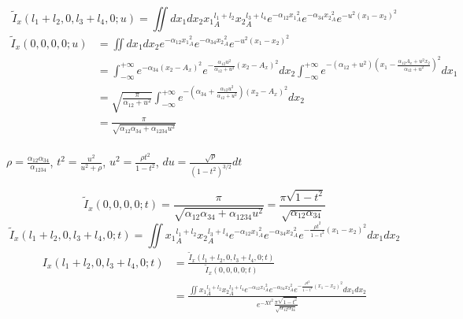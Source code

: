 \documentclass{article}
\begin{document}
	\begin{displaymath}
		\tilde{I}_x(l_1+l_2,0,l_3+l_4,0;u)=\iint dx_1 dx_2 {x_1}^{l_1+l_2}_A {x_2}^{l_3+l_4}_A 
		e^{-\alpha_{12} {x_1}_A^2} e^{-\alpha_{34} {x_2}^2_A} e^{-u^2(x_1-x_2)^2}
	\end{displaymath}
	\begin{displaymath}
		\begin{aligned}
			\tilde{I}_x(0,0,0,0;u)&=\iint dx_1 dx_2 e^{-\alpha_{12} {x_1}_A^2} 
			e^{-\alpha_{34} {x_2}^2_A} e^{-u^2(x_1-x_2)^2}\\
			&=\int_{-\infty}^{+\infty} e^{-\alpha_{34}(x_2-A_x)^2} 
			e^{-\frac{\alpha_{12}u^2}{\alpha_{12}+u^2}(x_2-A_x)^2} dx_2
			\int_{-\infty}^{+\infty} e^{-(\alpha_{12}+u^2)(x_1-\frac{\alpha_{12}A_x+u^2 x_2}{\alpha_{12}+u^2})^2} dx_1 \\
			&=\sqrt{\frac{\pi}{\alpha_{12}+u^2}} 
			\int_{-\infty}^{+\infty} e^{-(\alpha_{34}+\frac{\alpha_{12}u^2}{\alpha_{12}+u^2})(x_2-A_x)^2} dx_2 \\
			&=\frac{\pi}{\sqrt{\alpha_{12}\alpha_{34}+\alpha_{1234}u^2}}\\
		\end{aligned}
	\end{displaymath}
	\begin{center}
		$	\rho=\frac{\alpha_{12}\alpha_{34}}{\alpha_{1234}}	$, 
		$	t^2=\frac{u^2}{u^2+\rho}	$,
		$	u^2=\frac{\rho t^2}{1-t^2}	$,
		$	du=\frac{\sqrt{\rho}}{(1-t^2)^{3/2}} dt	$
	\end{center}
	\begin{displaymath}
		\tilde{I}_x(0,0,0,0;t)=\frac{\pi}{\sqrt{\alpha_{12}\alpha_{34}+\alpha_{1234}u^2}}
		=\frac{\pi \sqrt{1-t^2}}{\sqrt{\alpha_{12} \alpha_{34}}}
	\end{displaymath}
	\begin{displaymath}
		\tilde{I}_x(l_1+l_2,0,l_3+l_4,0;t)=\iint {x_1}^{l_1+l_2}_A {x_2}^{l_3+l_4}_A 
		e^{-\alpha_{12} {x_1}_A^2} e^{-\alpha_{34} {x_2}^2_A} e^{-\frac{\rho t^2}{1-t^2} (x_1-x_2)^2} dx_1 dx_2
	\end{displaymath}
	\begin{displaymath}
		\begin{aligned}
			I_x(l_1+l_2,0,l_3+l_4,0;t)&=\frac{\tilde{I}_x(l_1+l_2,0,l_3+l_4,0;t)}{\tilde{I}_x(0,0,0,0;t)}\\
			&=\frac{\iint {x_1}^{l_1+l_2}_A {x_2}^{l_3+l_4}_A e^{-\alpha_{12} {x_1}_A^2} 
			e^{-\alpha_{34} {x_2}^2_A} e^{-\frac{\rho t^2}{1-t^2} (x_1-x_2)^2} dx_1 dx_2 }
			{e^{-Xt^2} \frac{\pi \sqrt{1-t^2}}{\sqrt{\alpha_{12} \alpha_{34}}}}
		\end{aligned}
	\end{displaymath}
\end{document}
